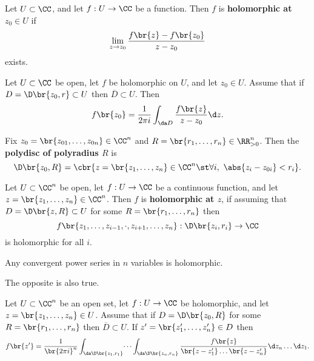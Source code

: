 \begin{definition}
Let $ U \subset \CC $, and let $ f : U \to \CC $ be a function. Then $ f $ is \textbf{holomorphic at $ z_0 \in U $} if
$$ \lim_{z \to z_0} \dfrac{f\br{z} - f\br{z_0}}{z - z_0} $$
exists.
\end{definition}

\begin{theorem}[Cauchy]
\label{thm:2.3}
Let $ U \subset \CC $ be open, let $ f $ be holomorphic on $ U $, and let $ z_0 \in U $. Assume that if $ D = \D\br{z_0, r} \subset U $ then $ \overline{D} \subset U $. Then
$$ f\br{z_0} = \dfrac{1}{2\pi i}\int_{\da D} \dfrac{f\br{z}}{z - z_0}\d z. $$
\end{theorem}

\begin{notation}
Fix $ z_0 = \br{z_{01}, \dots, z_{0n}} \in \CC^n $ and $ R = \br{r_1, \dots, r_n} \in \RR_{> 0}^n $. Then the \textbf{polydisc of polyradius $ R $} is
$$ \D\br{z_0, R} = \cbr{z = \br{z_1, \dots, z_n} \in \CC^n \st \forall i, \ \abs{z_i - z_{0i}} < r_i}. $$
\end{notation}

\begin{definition}
Let $ U \subset \CC^n $ be open, let $ f : U \to \CC $ be a continuous function, and let $ z = \br{z_1, \dots, z_n} \in \CC^n $. Then $ f $ is \textbf{holomorphic at $ z $}, if assuming that $ D = \D\br{z, R} \subset U $ for some $ R = \br{r_1, \dots, r_n} $ then
$$ f\br{z_1, \dots, z_{i - 1}, \cdot, z_{i + 1}, \dots, z_n} : \D\br{z_i, r_i} \to \CC $$
is holomorphic for all $ i $.
\end{definition}

\begin{example}
Any convergent power series in $ n $ variables is holomorphic.
\end{example}

The opposite is also true.

\begin{theorem}[Cauchy]
\label{thm:2.7}
Let $ U \subset \CC^n $ be an open set, let $ f : U \to \CC $ be holomorphic, and let $ z = \br{z_1, \dots, z_n} \in U $. Assume that if $ D = \D\br{z_0, R} $ for some $ R = \br{r_1, \dots, r_n} $ then $ \overline{D} \subset U $. If $ z' = \br{z_1', \dots, z_n'} \in D $ then
$$ f\br{z'} = \dfrac{1}{\br{2\pi i}^n}\int_{\da\D\br{z_1, r_1}} \dots \int_{\da\D\br{z_n, r_n}} \dfrac{f\br{z}}{\br{z - z_1'} \dots \br{z - z_n'}}\d z_n \dots \d z_1. $$
\end{theorem}

